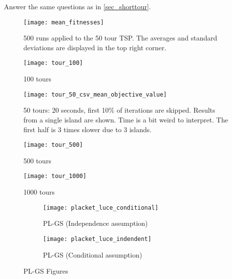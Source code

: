 \documentclass[a4paper,10pt]{article}
\newcommand{\ReplaceMe}[1]{{\color{blue}#1}}
\begin{document}
\ReplaceMe{Answer the same questions as in \cref{sec_shorttour}.}



\begin{figure}[htbp]
	\begin{minipage}{0.5\linewidth}
		\centering
		\texttt{[image: mean\_fitnesses]}
		\caption{500 runs applied to the 50 tour TSP. The averages and standard deviations are displayed in the top right corner.}
		\label{fig:meanfitnesses}
	\end{minipage}%
	\begin{minipage}{0.5\linewidth}
		\centering
		\texttt{[image: tour\_100]}
		\caption{100 tours}
		\label{fig:tour100}
	\end{minipage}
	
	\begin{minipage}{0.5\linewidth}
		\centering
		\texttt{[image: tour\_50\_csv\_mean\_objective\_value]}
		\caption{50 tours: 20 seconds, first 10\% of iterations are skipped. Results from a single island are shown. Time is a bit weird to interpret. The first half is 3 times slower due to 3 islands.}
		\label{fig:tour50csvmeanobjectivevalue}
	\end{minipage}%
	\begin{minipage}{0.5\linewidth}
		\centering
		\texttt{[image: tour\_500]}
		\caption{500 tours}
		\label{fig:tour500}
	\end{minipage}
	\begin{minipage}{0.5\linewidth}
		\centering
		\texttt{[image: tour\_1000]}
		\caption{1000 tours}
		\label{fig:tour1000}
	\end{minipage}%
\end{figure}
	
\begin{figure}[htbp]
		\centering
		\begin{subfigure}{0.48\linewidth}
			\texttt{[image: placket\_luce\_conditional]}
			\caption{PL-GS (Independence assumption)}
			\label{fig:placketluceconditional}
		\end{subfigure}
		\hfill
		\begin{subfigure}{0.48\linewidth}
			\texttt{[image: placket\_luce\_indendent]}
			\caption{PL-GS (Conditional assumption)}
			\label{fig:placketluceindendent}
		\end{subfigure}
		\caption{PL-GS Figures}
\end{figure}
	
\end{document}
